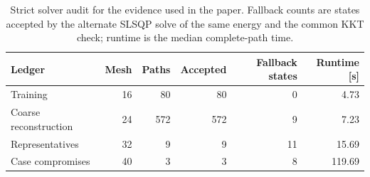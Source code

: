 \begin{table}[t]
\centering
\caption{Strict solver audit for the evidence used in the paper. Fallback counts are states accepted by the alternate SLSQP solve of the same energy and the common KKT check; runtime is the median complete-path time.}
\label{tab:solver_audit_fast}
\begin{tabular}{lrrrrr}
\toprule
Ledger & Mesh & Paths & Accepted & Fallback states & Runtime [s] \\
\midrule
Training & 16 & 80 & 80 & 0 & 4.73 \\
Coarse reconstruction & 24 & 572 & 572 & 9 & 7.23 \\
Representatives & 32 & 9 & 9 & 11 & 15.69 \\
Case compromises & 40 & 3 & 3 & 8 & 119.69 \\
\bottomrule
\end{tabular}
\end{table}

